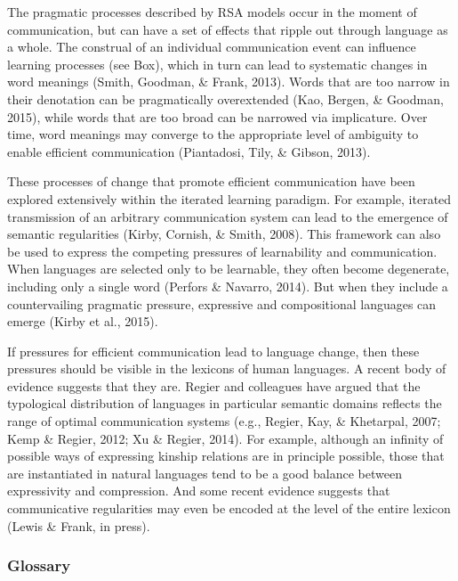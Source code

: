 \documentclass[]{elsarticle}
\begin{document}
The pragmatic processes described by RSA models occur in the moment of
communication, but can have a set of effects that ripple out through
language as a whole. The construal of an individual communication event
can influence learning processes (see Box), which in turn can lead to
systematic changes in word meanings (Smith, Goodman, \& Frank, 2013).
Words that are too narrow in their denotation can be pragmatically
overextended (Kao, Bergen, \& Goodman, 2015), while words that are too
broad can be narrowed via implicature. Over time, word meanings may
converge to the appropriate level of ambiguity to enable efficient
communication (Piantadosi, Tily, \& Gibson, 2013).

These processes of change that promote efficient communication have been
explored extensively within the iterated learning paradigm. For example,
iterated transmission of an arbitrary communication system can lead to
the emergence of semantic regularities (Kirby, Cornish, \& Smith, 2008).
This framework can also be used to express the competing pressures of
learnability and communication. When languages are selected only to be
learnable, they often become degenerate, including only a single word
(Perfors \& Navarro, 2014). But when they include a countervailing
pragmatic pressure, expressive and compositional languages can emerge
(Kirby et al., 2015).

If pressures for efficient communication lead to language change, then
these pressures should be visible in the lexicons of human languages. A
recent body of evidence suggests that they are. Regier and colleagues
have argued that the typological distribution of languages in particular
semantic domains reflects the range of optimal communication systems
(e.g., Regier, Kay, \& Khetarpal, 2007; Kemp \& Regier, 2012; Xu \&
Regier, 2014). For example, although an infinity of possible ways of
expressing kinship relations are in principle possible, those that are
instantiated in natural languages tend to be a good balance between
expressivity and compression. And some recent evidence suggests that
communicative regularities may even be encoded at the level of the
entire lexicon (Lewis \& Frank, in press).

\subsubsection{Glossary}\label{glossary}
\end{document}
